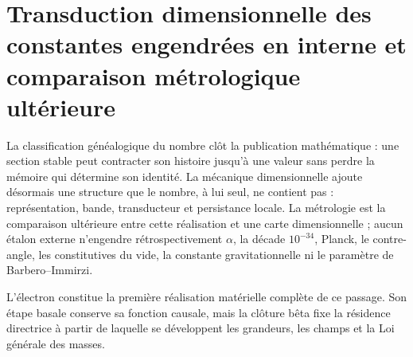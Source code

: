 \providecommand{\HMTParteIIIConstantesTransitionsRoot}{sections/transiciones_constantes}

\section{Transduction dimensionnelle des constantes engendrées en interne et comparaison métrologique ultérieure}

La classification généalogique du nombre clôt la publication mathématique : une section stable peut contracter son histoire jusqu'à une valeur sans perdre la mémoire qui détermine son identité. La mécanique dimensionnelle ajoute désormais une structure que le nombre, à lui seul, ne contient pas : représentation, bande, transducteur et persistance locale. La métrologie est la comparaison ultérieure entre cette réalisation et une carte dimensionnelle ; aucun étalon externe n'engendre rétrospectivement \(\alpha\), la décade \(10^{-34}\), Planck, le contre-angle, les constitutives du vide, la constante gravitationnelle ni le paramètre de Barbero--Immirzi.



L'électron constitue la première réalisation matérielle complète de ce passage. Son étape basale conserve sa fonction causale, mais la clôture bêta fixe la résidence directrice à partir de laquelle se développent les grandeurs, les champs et la Loi générale des masses.
